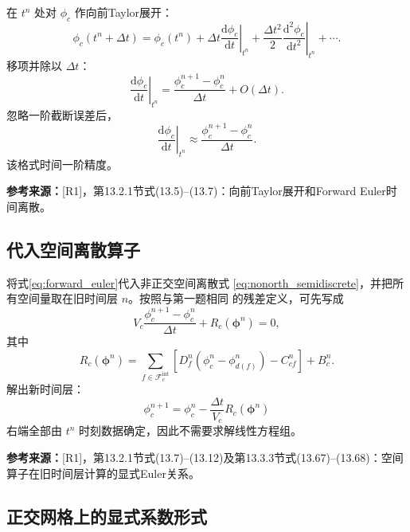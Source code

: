 \documentclass[UTF8,12pt,a4paper]{ctexart}
\numberwithin{equation}{section}
\newcommand{\Rone}{\textnormal{[R1]}}
\newcommand{\source}[1]{%
  \par\smallskip
  \noindent\colorbox{sourcebg}{%
    \parbox{0.955\linewidth}{\raggedright\footnotesize\color{sourcegray}\textbf{参考来源：}#1}%
  }
  \par\smallskip
}
\begin{document}
在 $t^n$ 处对 $\phi_c$ 作向前Taylor展开：
\begin{equation}
  \phi_c(t^n+\Delta t)
  =\phi_c(t^n)
  +\Delta t\left.\frac{\mathrm d\phi_c}{\mathrm dt}\right|_{t^n}
  +\frac{\Delta t^2}{2}
   \left.\frac{\mathrm d^2\phi_c}{\mathrm dt^2}\right|_{t^n}
  +\cdots.
  \label{eq:taylor_time}
\end{equation}
移项并除以 $\Delta t$：
\begin{equation}
  \left.\frac{\mathrm d\phi_c}{\mathrm dt}\right|_{t^n}
  =\frac{\phi_c^{n+1}-\phi_c^n}{\Delta t}
  +O(\Delta t).
  \label{eq:forward_difference}
\end{equation}
忽略一阶截断误差后，
\begin{equation}
  \boxed{
  \left.\frac{\mathrm d\phi_c}{\mathrm dt}\right|_{t^n}
  \approx\frac{\phi_c^{n+1}-\phi_c^n}{\Delta t}}.
  \label{eq:forward_euler}
\end{equation}
该格式时间一阶精度。

\source{\Rone，第13.2.1节式(13.5)--(13.7)：向前Taylor展开和Forward Euler时间离散。}

\subsection{代入空间离散算子}

将式\eqref{eq:forward_euler}代入非正交空间离散式
\eqref{eq:nonorth_semidiscrete}，并把所有空间量取在旧时间层 $n$。按照与第一题相同
的残差定义，可先写成
\begin{equation}
  V_c\frac{\phi_c^{n+1}-\phi_c^n}{\Delta t}
  +R_c(\bm\phi^n)=0,
  \label{eq:fully_discrete_before_solve}
\end{equation}
其中
\begin{equation}
  R_c(\bm\phi^n)
  =\sum_{f\in\mathcal F_c^{\mathrm{int}}}
  \left[D_f^n(\phi_c^n-\phi_{d(f)}^n)-C_{cf}^n\right]+B_c^n.
  \label{eq:explicit_diffusive_residual}
\end{equation}
解出新时间层：
\begin{equation}
  \boxed{
  \phi_c^{n+1}
  =\phi_c^n
  -\frac{\Delta t}{V_c}R_c(\bm\phi^n)}
  \label{eq:fully_explicit_general}
\end{equation}
右端全部由 $t^n$ 时刻数据确定，因此不需要求解线性方程组。

\source{\Rone，第13.2.1节式(13.7)--(13.12)及第13.3.3节式(13.67)--(13.68)：空间算子在旧时间层计算的显式Euler关系。}

\subsection{正交网格上的显式系数形式}
\end{document}
